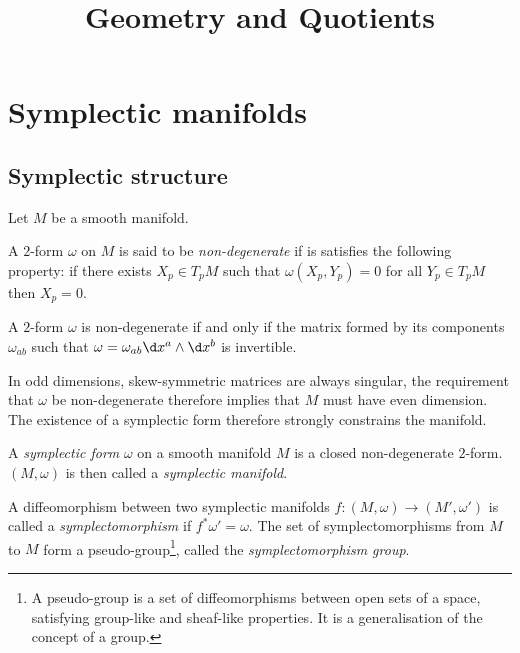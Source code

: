 \documentclass{worksheetclass}
\title{Geometry and Quotients}
\begin{document}
\maketitle

\tableofcontents

\pagebreak

\section{Symplectic manifolds}

    \subsection{Symplectic structure}

        Let $M$ be a smooth manifold.    
        \begin{defn}
            A $2$-form $\omega$ on $M$ is said to be \emph{non-degenerate} if is satisfies the following property: if there exists $X_p\in T_pM$ such that $\omega(X_p,Y_p)=0$ for all $Y_p\in T_pM$ then $X_p=0$.
        \end{defn}
        
        \begin{prop}
            A $2$-form $\omega$ is non-degenerate if and only if the matrix formed by its components $\omega_{ab}$ such that $\omega=\omega_{ab}\d x^a\wedge\d x^b$ is invertible.
        \end{prop}
        
        In odd dimensions, skew-symmetric matrices are always singular, the requirement that $\omega$ be non-degenerate therefore implies that $M$ must have even dimension. The existence of a symplectic form therefore strongly constrains the manifold.
    
        \begin{defn}
            A \emph{symplectic form} $\omega$ on a smooth manifold $M$ is a closed non-degenerate $2$-form. $(M,\omega)$ is then called a \emph{symplectic manifold}.
        \end{defn}
        \begin{defn}
            A diffeomorphism between two symplectic manifolds $f:(M,\omega)\to(M',\omega')$ is called a \emph{symplectomorphism} if $f^*\omega' = \omega$. The set of symplectomorphisms from $M$ to $M$ form a pseudo-group\footnote{A pseudo-group is a set of diffeomorphisms between open sets of a space, satisfying group-like and sheaf-like properties. It is a generalisation of the concept of a group.}, called the \emph{symplectomorphism group}.
        \end{defn}
\end{document}
